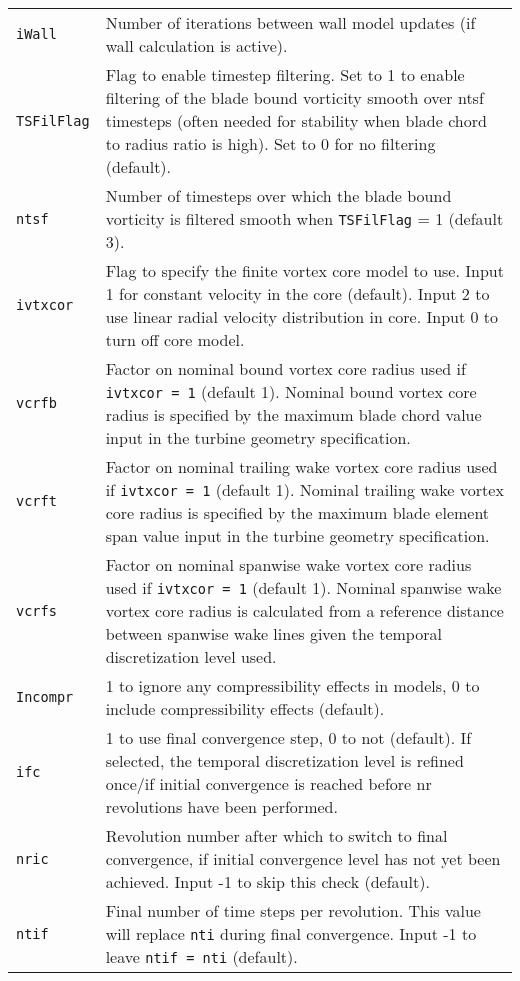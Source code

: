 \begin{longtable}{p{}p{}}
\texttt{iWall}                & Number of iterations between wall model updates (if wall calculation is active). \\ 
\texttt{TSFilFlag}            & Flag to enable timestep filtering. Set to 1 to enable filtering of the blade bound vorticity smooth over ntsf timesteps (often needed for stability when blade chord to radius ratio is high). Set to 0 for no filtering (default). \\ 
\texttt{ntsf}                 & Number of timesteps over which the blade bound vorticity is filtered smooth when \texttt{TSFilFlag} = 1 (default 3). \\ 
\texttt{ivtxcor}              & Flag to specify the finite vortex core model to use. Input 1 for constant velocity in the core (default). Input 2 to use linear radial velocity distribution in core. Input 0 to turn off core model. \\ 
\texttt{vcrfb}                & Factor on nominal bound vortex core radius used if \texttt{ivtxcor = 1} (default 1). Nominal bound vortex core radius is specified by the maximum blade chord value input in the turbine geometry specification. \\ 
\texttt{vcrft}                & Factor on nominal trailing wake vortex core radius used if \texttt{ivtxcor = 1} (default 1). Nominal trailing wake vortex core radius is specified by the maximum blade element span value input in the turbine geometry specification. \\ 
\texttt{vcrfs}                & Factor on nominal spanwise wake vortex core radius used if \texttt{ivtxcor = 1} (default 1). Nominal spanwise wake vortex core radius is calculated from a reference distance between spanwise wake lines given the temporal discretization level used. \\ 
\texttt{Incompr}              & 1 to ignore any compressibility effects in models, 0 to include compressibility effects (default). \\ 
\texttt{ifc}                  & 1 to use final convergence step, 0 to not (default). If selected, the temporal discretization level is refined once/if initial convergence is reached before nr revolutions have been performed. \\ 
\texttt{nric}                 & Revolution number after which to switch to final convergence, if initial convergence level has not yet been achieved. Input -1 to skip this check (default). \\ 
\texttt{ntif}                 & Final number of time steps per revolution. This value will replace \texttt{nti} during final convergence. Input -1 to leave \texttt{ntif = nti} (default). \\ 

\end{longtable}
